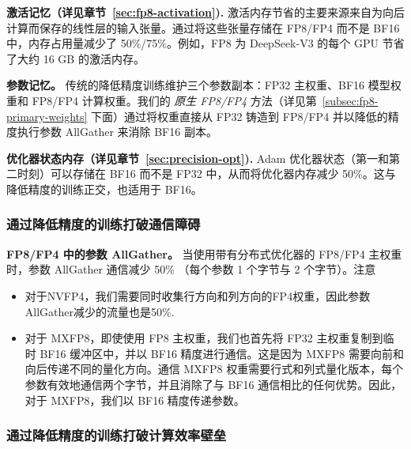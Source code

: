 \documentclass[10pt,logo,copyright]{nvidiatechreport_zh}
\begin{document}
\textbf{激活记忆（详见章节~\ref{sec:fp8-activation}).} 激活内存节省的主要来源来自为向后计算而保存的线性层的输入张量。通过将这些张量存储在 FP8/FP4 而不是 BF16 中，内存占用量减少了 50\%/75\%。例如，FP8 为 DeepSeek-V3 的每个 GPU 节省了大约 16 GB 的激活内存。

\textbf{参数记忆。} 传统的降低精度训练维护三个参数副本：FP32 主权重、BF16 模型权重和 FP8/FP4 计算权重。我们的 \emph{原生 FP8/FP4} 方法（详见第~\ref{subsec:fp8-primary-weights} 下面）通过将权重直接从 FP32 铸造到 FP8/FP4 并以降低的精度执行参数 AllGather 来消除 BF16 副本。

\textbf{优化器状态内存（详见章节~\ref{sec:precision-opt}).} Adam 优化器状态（第一和第二时刻）可以存储在 BF16 而不是 FP32 中，从而将优化器内存减少 50\%。这与降低精度的训练正交，也适用于 BF16。

\subsubsection{通过降低精度的训练打破通信障碍}
\label{sec:comm_wall_quantized_training}


\textbf{FP8/FP4 中的参数 AllGather。} 当使用带有分布式优化器的 FP8/FP4 主权重时，参数 AllGather 通信减少 50\% （每个参数 1 个字节与 2 个字节）。注意
\begin{itemize}
    \item 对于NVFP4，我们需要同时收集行方向和列方向的FP4权重，因此参数AllGather减少的流量也是50\%.
    \item 对于 MXFP8，即使使用 FP8 主权重，我们也首先将 FP32 主权重复制到临时 BF16 缓冲区中，并以 BF16 精度进行通信。这是因为 MXFP8 需要向前和向后传递不同的量化方向。通信 MXFP8 权重需要行式和列式量化版本，每个参数有效地通信两个字节，并且消除了与 BF16 通信相比的任何优势。因此，对于 MXFP8，我们以 BF16 精度传递参数。 
\end{itemize}

\subsubsection{通过降低精度的训练打破计算效率壁垒}
\end{document}
